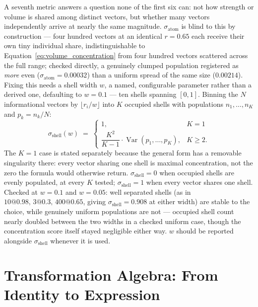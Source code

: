 \documentclass[12pt, a4paper]{article}
\begin{document}
A seventh metric answers a question none of the first six can: not
how strength or volume is shared among distinct vectors, but whether
many vectors independently arrive at nearly the same magnitude.
$\sigma_{\text{atom}}$ is blind to this by construction --- four
hundred vectors at an identical $r=0.65$ each receive their own tiny
individual share, indistinguishable to
Equation~\eqref{eq:volume_concentration} from four hundred vectors
scattered across the full range; checked directly, a genuinely
clumped population registered as \emph{more} even
($\sigma_{\text{atom}}=0.00032$) than a uniform spread of the same
size ($0.00214$). Fixing this needs a shell width $w$, a named,
configurable parameter rather than a derived one, defaulting to
$w=0.1$ --- ten shells spanning $[0,1]$. Binning the $N$
informational vectors by $\lfloor r_i/w\rfloor$ into $K$ occupied
shells with populations $n_1,\ldots,n_K$ and $p_k = n_k/N$:
\begin{equation}
    \sigma_{\text{shell}}(w) \;=\;
    \begin{cases}
        1, & K=1 \\[4pt]
        \dfrac{K^2}{K-1}\cdot\operatorname{Var}(p_1,\ldots,p_K), & K\ge 2.
    \end{cases}
    \label{eq:shell_concentration}
\end{equation}
The $K=1$ case is stated separately because the general form has a
removable singularity there: every vector sharing one shell is
maximal concentration, not the zero the formula would otherwise
return. $\sigma_{\text{shell}}=0$ when occupied shells are evenly
populated, at every $K$ tested; $\sigma_{\text{shell}}=1$ when every
vector shares one shell. Checked at $w=0.1$ and $w=0.05$: well
separated shells (as in $10@0.98,\,3@0.3,\,400@0.65$, giving
$\sigma_{\text{shell}}=0.908$ at either width) are stable to the
choice, while genuinely uniform populations are not --- occupied
shell count nearly doubled between the two widths in a checked
uniform case, though the concentration score itself stayed
negligible either way. $w$ should be reported alongside
$\sigma_{\text{shell}}$ whenever it is used.


\section{Transformation Algebra: From Identity to Expression}
\label{sec:transformation_algebra}
\end{document}
